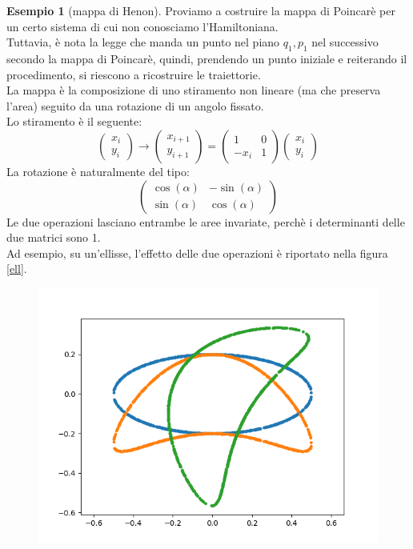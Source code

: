 \documentclass[a4paper,12pt]{article}
\theoremstyle{plain}
\theoremstyle{definition}
\newtheorem{exmp}{Esempio}[section]
\theoremstyle{remark}
\begin{document}
\begin{exmp}[mappa di Henon]
	Proviamo a costruire la mappa di Poincarè per un certo sistema di cui non conosciamo l'Hamiltoniana.\\Tuttavia, è nota la legge che manda un punto nel piano $q_1,p_1$ nel successivo secondo la mappa di Poincarè, quindi, prendendo un punto iniziale e reiterando il procedimento, si riescono a ricostruire le traiettorie.\\
	La mappa è la composizione di uno stiramento non lineare (ma che preserva l'area) seguito da una rotazione di un angolo fissato.\\
	Lo stiramento è il seguente:
	\[\begin{pmatrix}
	x_i\\y_i
	\end{pmatrix}\rightarrow	\begin{pmatrix}
	x_{i+1}\\y_{i+1}\end{pmatrix}=\begin{pmatrix}
	1&0\\-x_i &1
	\end{pmatrix}
	\begin{pmatrix}
	x_i\\y_i
	\end{pmatrix}	\]
	La rotazione è naturalmente del tipo:
	\[\begin{pmatrix}
	\cos(\alpha)&-\sin(\alpha)\\\sin(\alpha)&\cos(\alpha)
	\end{pmatrix}\]
	Le due operazioni lasciano entrambe le aree invariate, perchè i determinanti delle due matrici sono 1.\\
	Ad esempio, su un'ellisse, l'effetto delle due operazioni è riportato nella  figura \ref{ell}.\begin{figure}[h]
		\centering
		\includegraphics[scale=0.6]{ellisse}

\end{figure}
\end{exmp}
\end{document}
